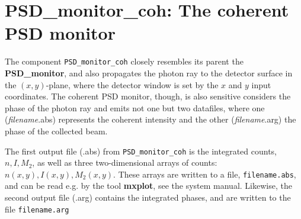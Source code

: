 \section{PSD\_monitor\_coh: The coherent PSD monitor}

The component \texttt{PSD\_monitor\_coh} closely resembles its parent the \textbf{PSD\_monitor}, 
and also propagates the photon ray to the detector
surface in the $(x,y)$-plane, where the detector window is set
by the $x$ and $y$ input coordinates.
The coherent PSD monitor, though, is also sensitive considers the phase of the photon ray
and emits not one but two datafiles, where one (\textit{filename}.abs) represents the coherent intensity 
and the other (\textit{filename}.arg) the phase of the collected beam.

The first output file (.abs) from \texttt{PSD\_monitor\_coh} is the integrated counts, $n, I, M_2$,
as well as three two-dimensional arrays of counts: $n(x,y), I(x,y), M_2(x,y)$.
These arrays are written to a file, \verb+filename.abs+, and can be read e.g. by the tool
\textbf{mxplot}, see the system manual.
Likewise, the second output file (.arg) contains the integrated phases, and are written to the file 
\verb+filename.arg+
